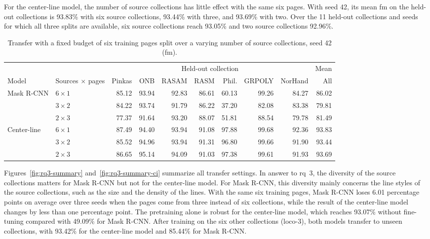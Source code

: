 For the center-line model, the number of source collections has little effect with the same six pages. With seed 42, its mean \gls{fm} on the held-out collections is 93.83\% with six source collections, 93.44\% with three, and 93.69\% with two. Over the 11 held-out collections and seeds for which all three splits are available, six source collections reach 93.05\% and two source collections 92.96\%.

\begin{table}[htbp]
    \centering
    \caption{Transfer with a fixed budget of six training pages split over a varying number of source collections, seed 42 (\gls{fm}).}
    \label{tab:rq3-budget}
    \footnotesize
    \setlength{\tabcolsep}{3pt}
    \begin{tabular}{@{}ll*{7}{r}r@{}}
        \toprule
        & & \multicolumn{7}{c}{Held-out collection} & Mean \\
        \cmidrule(lr){3-9}
        Model & Sources \(\times\) pages & Pinkas & ONB & RASAM & RASM & Phil. & GRPOLY & NorHand & All \\
        \midrule
        Mask R-CNN & \(6\times1\) & 85.12 & 93.94 & 92.83 & 86.61 & 60.13 & 99.26 & 84.27 & 86.02 \\
                   & \(3\times2\) & 84.22 & 93.74 & 91.79 & 86.22 & 37.20 & 82.08 & 83.38 & 79.81 \\
                   & \(2\times3\) & 77.37 & 91.64 & 93.20 & 88.07 & 51.81 & 88.54 & 79.78 & 81.49 \\
        \midrule
        Center-line & \(6\times1\) & 87.49 & 94.40 & 93.94 & 91.08 & 97.88 & 99.68 & 92.36 & 93.83 \\
                    & \(3\times2\) & 85.52 & 94.96 & 93.94 & 91.31 & 96.80 & 99.66 & 91.90 & 93.44 \\
                    & \(2\times3\) & 86.65 & 95.14 & 94.09 & 91.03 & 97.38 & 99.61 & 91.93 & 93.69 \\
        \bottomrule
    \end{tabular}
\end{table}

\FloatBarrier

Figures~\ref{fig:rq3-summary} and~\ref{fig:rq3-summary-ci} summarize all transfer settings. In answer to \gls{rq}~3, the diversity of the source collections matters for Mask R-CNN but not for the center-line model. For Mask R-CNN, this diversity mainly concerns the line styles of the source collections, such as the size and the density of the lines. With the same six training pages, Mask R-CNN loses 6.01 percentage points on average over three seeds when the pages come from three instead of six collections, while the result of the center-line model changes by less than one percentage point. The pretraining alone is robust for the center-line model, which reaches 93.07\% without fine-tuning compared with 49.09\% for Mask R-CNN. After training on the six other collections (\gls{loco}-3), both models transfer to unseen collections, with 93.42\% for the center-line model and 85.44\% for Mask R-CNN.

